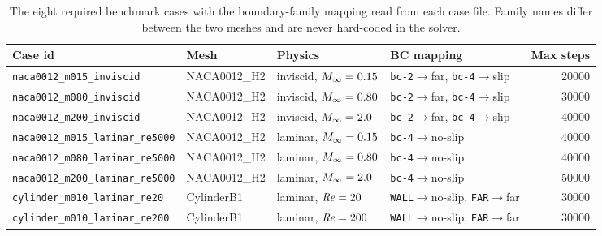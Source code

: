 \begin{table}[htbp]
  \centering
  \caption{The eight required benchmark cases with the boundary-family
  mapping read from each case file. Family names differ between the two meshes
  and are never hard-coded in the solver.}
  \label{tab:cases}
  \small
  \begin{tabular}{llllr}
    \toprule
    Case id & Mesh & Physics & BC mapping & Max steps \\
    \midrule
    \texttt{naca0012\_m015\_inviscid} & NACA0012\_H2 & inviscid, $M_\infty=0.15$
      & \texttt{bc-2}$\to$far, \texttt{bc-4}$\to$slip & \num{20000} \\
    \texttt{naca0012\_m080\_inviscid} & NACA0012\_H2 & inviscid, $M_\infty=0.80$
      & \texttt{bc-2}$\to$far, \texttt{bc-4}$\to$slip & \num{30000} \\
    \texttt{naca0012\_m200\_inviscid} & NACA0012\_H2 & inviscid, $M_\infty=2.0$
      & \texttt{bc-2}$\to$far, \texttt{bc-4}$\to$slip & \num{40000} \\
    \texttt{naca0012\_m015\_laminar\_re5000} & NACA0012\_H2 & laminar, $M_\infty=0.15$
      & \texttt{bc-4}$\to$no-slip & \num{40000} \\
    \texttt{naca0012\_m080\_laminar\_re5000} & NACA0012\_H2 & laminar, $M_\infty=0.80$
      & \texttt{bc-4}$\to$no-slip & \num{40000} \\
    \texttt{naca0012\_m200\_laminar\_re5000} & NACA0012\_H2 & laminar, $M_\infty=2.0$
      & \texttt{bc-4}$\to$no-slip & \num{50000} \\
    \texttt{cylinder\_m010\_laminar\_re20} & CylinderB1 & laminar, $\mathit{Re}=20$
      & \texttt{WALL}$\to$no-slip, \texttt{FAR}$\to$far & \num{30000} \\
    \texttt{cylinder\_m010\_laminar\_re200} & CylinderB1 & laminar, $\mathit{Re}=200$
      & \texttt{WALL}$\to$no-slip, \texttt{FAR}$\to$far & \num{30000} \\
    \bottomrule
  \end{tabular}
\end{table}
